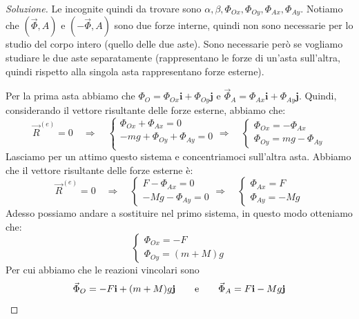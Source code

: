 \documentclass[11pt,a4paper,twoside]{article}
\theoremstyle{definition}
\newenvironment{sol}
	{\renewcommand\qedsymbol{$\blacksquare$}\begin{proof}[Soluzione]}
	{\end{proof}}
\begin{document}
\begin{sol}
	Le incognite quindi da trovare sono $\alpha, \beta, \Phi_{Ox}, \Phi_{Oy}, \Phi_{Ax}, \Phi_{Ay}$. Notiamo che $(\vec \Phi, A)$ e $(-\vec \Phi, A)$ sono due forze interne, quindi non sono necessarie per lo studio del corpo intero (quello delle due aste). Sono necessarie però se vogliamo studiare le due aste separatamente (rappresentano le forze di un'asta sull'altra, quindi rispetto alla singola asta rappresentano forze esterne).

	Per la prima asta abbiamo che $\Phi_O = \Phi_{Ox} \mathbf i + \Phi_{Oy} \mathbf j$ e $\vec \Phi_A = \Phi_{Ax} \mathbf i + \Phi_{Ay} \mathbf j$. Quindi, considerando il vettore risultante delle forze esterne, abbiamo che:
	\[ \vec R^{(e)} = 0 \quad \Rightarrow \quad
		\begin{cases}
			\Phi_{Ox} + \Phi_{Ax} = 0\\
			-mg + \Phi_{Oy} + \Phi_{Ay} = 0\\
		\end{cases} \Rightarrow \quad \begin{cases}
			\Phi_{Ox} = - \Phi_{Ax}\\
			\Phi_{Oy} = mg - \Phi_{Ay}
		\end{cases}
	\]
	Lasciamo per un attimo questo sistema e concentriamoci sull'altra asta.
	Abbiamo che il vettore risultante delle forze esterne è:
	\[
		\vec R^{(e)} = 0 \quad \Rightarrow \quad \begin{cases}
			F-\Phi_{Ax} = 0\\
			-Mg - \Phi_{Ay} = 0
		\end{cases} \Rightarrow \quad \begin{cases}
			\Phi_{Ax} = F\\
			\Phi_{Ay} = -Mg
		\end{cases}
	\]
	Adesso possiamo andare a sostituire nel primo sistema, in questo modo otteniamo che:
	\[ \begin{cases}
		\Phi_{Ox} = -F\\
		\Phi_{Oy} = (m+M)g
	\end{cases}\]
	Per cui abbiamo che le reazioni vincolari sono
	\[ \vec \Phi_O = -F \mathbf i + (m+M)g \mathbf j\qquad \text e \qquad \vec \Phi_A = F \mathbf i - Mg \mathbf j \]


\end{sol}
\end{document}
